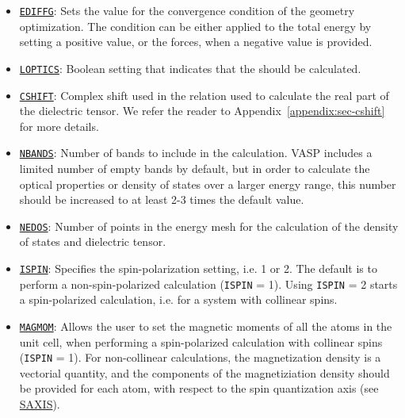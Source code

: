 \begin{refsection}
\begin{itemize}
 \label{appendix:sec-EDIFFG} 
\item \href{https://cms.mpi.univie.ac.at/wiki/index.php/EDIFFG}{\texttt{EDIFFG}}: 
Sets the value for the convergence condition of the geometry optimization. The 
condition can be either applied to the total energy by setting a positive value, 
or the forces, when a negative value is provided.
 
 \label{appendix:sec-LOPTICS} 
\item \href{https://cms.mpi.univie.ac.at/wiki/index.php/LOPTICS}{\texttt{LOPTICS}}: 
Boolean setting that indicates that the 
 should be 
calculated.

 \label{appendix:sec-CSHIFT} 
\item \href{https://cms.mpi.univie.ac.at/wiki/index.php/CSHIFT}{\texttt{CSHIFT}}: 
Complex shift used in the  relation used to calculate 
the real part of the dielectric tensor. We refer the reader to 
Appendix~\ref{appendix:sec-cshift} for more details.

 \label{appendix:sec-NBANDS} 
\item \href{https://cms.mpi.univie.ac.at/wiki/index.php/NBANDS}{\texttt{NBANDS}}: 
Number of bands to include in the calculation. \gls{VASP} includes a limited 
number of empty bands by default, but in order to calculate the optical properties 
or density of states over a larger energy range, this number should be increased 
to at least 2-3 times the default value.

 \label{appendix:sec-NEDOS} 
\item \href{https://cms.mpi.univie.ac.at/wiki/index.php/NEDOS}{\texttt{NEDOS}}: 
Number of points in the energy mesh for the calculation of the density of states 
and dielectric tensor.
 
 \label{appendix:sec-ISPIN} 
\item \href{https://cms.mpi.univie.ac.at/wiki/index.php/ISPIN}{\texttt{ISPIN}}: 
Specifies the spin-polarization setting, i.e. 1 or 2. The default is to perform 
a non-spin-polarized calculation (\texttt{ISPIN} = 1). Using \texttt{ISPIN} = 2 
starts a spin-polarized calculation, i.e. for a system with collinear spins.
 
 \label{appendix:sec-MAGMOM} 
\item \href{https://cms.mpi.univie.ac.at/wiki/index.php/MAGMOM}{\texttt{MAGMOM}}: 
Allows the user to set the magnetic moments of all the atoms in the unit cell, 
when performing a spin-polarized calculation with collinear spins (\texttt{ISPIN} = 1).
For non-collinear calculations, the magnetization density is a vectorial quantity, 
and the components of the magnetiziation density should be provided for each atom, 
with respect to the spin quantization axis (see 
\href{https://cms.mpi.univie.ac.at/wiki/index.php/SAXIS}{SAXIS}).


\end{itemize}
\end{refsection}
